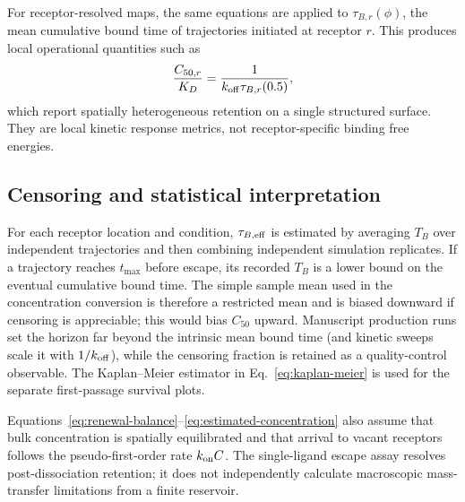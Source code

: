 For receptor-resolved maps, the same equations are applied to
$\tau_{B,r}(\phi)$, the mean cumulative bound time of trajectories initiated
at receptor $r$.  This produces local operational quantities such as
\begin{equation}
 \frac{C_{50,r}}{K_D}
 =\frac{1}{k_{\mathrm{off}}\tau_{B,r}(0.5)},
 \label{eq:local-C50}
\end{equation}
which report spatially heterogeneous retention on a single structured
surface.  They are local kinetic response metrics, not receptor-specific
binding free energies.

\subsection{Censoring and statistical interpretation}

For each receptor location and condition, $\tau_{B,\mathrm{eff}}$ is estimated by averaging
$T_B$ over independent trajectories and then combining independent simulation
replicates.  If a trajectory reaches $t_{\max}$ before escape, its recorded
$T_B$ is a lower bound on the eventual cumulative bound time.  The simple
sample mean used in the concentration conversion is therefore a restricted
mean and is biased downward if censoring is appreciable; this would bias
$C_{50}$ upward.  Manuscript production runs set the horizon far beyond the
intrinsic mean bound time (and kinetic sweeps scale it with $1/k_{\mathrm{off}}$), while
the censoring fraction is retained as a quality-control observable.  The
Kaplan--Meier estimator in Eq.~\ref{eq:kaplan-meier} is used for the separate
first-passage survival plots.

Equations~\ref{eq:renewal-balance}--\ref{eq:estimated-concentration} also assume
that bulk concentration is spatially equilibrated and that arrival to vacant
receptors follows the pseudo-first-order rate $k_{\mathrm{on}} C$.  The single-ligand
escape assay resolves post-dissociation retention; it does not independently
calculate macroscopic mass-transfer limitations from a finite reservoir.
